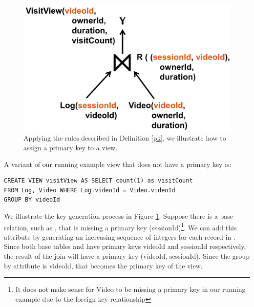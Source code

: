 
\begin{figure}[t]
\centering
 \includegraphics[scale=0.20]{figs/primary_key.png} \vspace{-.5em}
 \caption{Applying the rules described in Definition \ref{pk}, we illustrate how to assign a primary key to a view.  \label{pk-fig}}\vspace{-1.5em}
\end{figure}

\begin{example}
A variant of our running example view that does not have a primary key is:
\begin{lstlisting}[mathescape,basicstyle={\scriptsize}]
CREATE VIEW visitView AS SELECT count(1) as visitCount
FROM Log, Video WHERE Log.videoId = Video.videoId
GROUP BY videoId
\end{lstlisting}
We illustrate the key generation process in Figure \ref{pk-fig}.
Suppose there is a base relation, such as , that is missing a primary key (sessionId)\footnote{\scriptsize It does not make sense for Video to be missing a primary key in our running example due to the foreign key relationship}.
We can add this attribute by generating an increasing sequence of integers for each record in . 
Since both base tables  and  have primary keys videoId and sessionId respectively,
the result of the join will have a primary key (videoId, sessionId).
Since the group by attribute is videoId, that becomes the primary key of the view.
\end{example}

